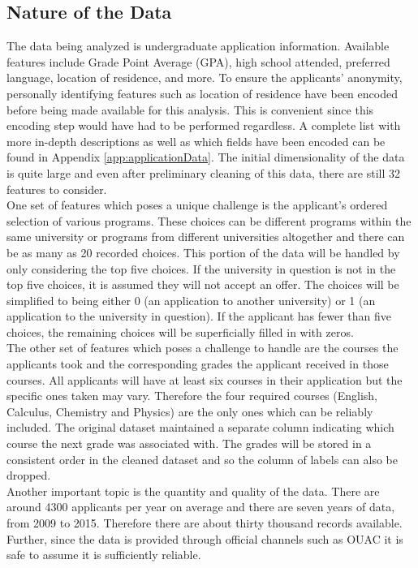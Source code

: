 \documentclass[titlepage]{article}
\begin{document}
\subsection{Nature of the Data}
The data being analyzed is undergraduate application information. Available features include Grade Point Average (GPA), high school attended, preferred language, location of residence, and more. To ensure the applicants' anonymity, personally identifying features such as location of residence have been encoded before being made available for this analysis. This is convenient since this encoding step would have had to be performed regardless. A complete list with more in-depth descriptions as well as which fields have been encoded can be found in Appendix \ref{app:applicationData}. The initial dimensionality of the data is quite large and even after preliminary cleaning of this data, there are still 32 features to consider.\\
One set of features which poses a unique challenge is the applicant's ordered selection of various programs. These choices can be different programs within the same university or programs from different universities altogether and there can be as many as 20 recorded choices. This portion of the data will be handled by only considering the top five choices. If the university in question is not in the top five choices, it is assumed they will not accept an offer. The choices will be simplified to being either 0 (an application to another university) or 1 (an application to the university in question). If the applicant has fewer than five choices, the remaining choices will be superficially filled in with zeros.\\
The other set of features which poses a challenge to handle are the courses the applicants took and the corresponding grades the applicant received in those courses. All applicants will have at least six courses in their application but the specific ones taken may vary. Therefore the four required courses (English, Calculus, Chemistry and Physics) are the only ones which can be reliably included. The original dataset maintained a separate column indicating which course the next grade was associated with. The grades will be stored in a consistent order in the cleaned dataset and so the column of labels can also be dropped.\\
Another important topic is the quantity and quality of the data. There are around 4300 applicants per year on average and there are seven years of data, from 2009 to 2015. Therefore there are about thirty thousand records available. Further, since the data is provided through official channels such as OUAC it is safe to assume it is sufficiently reliable.
\end{document}

